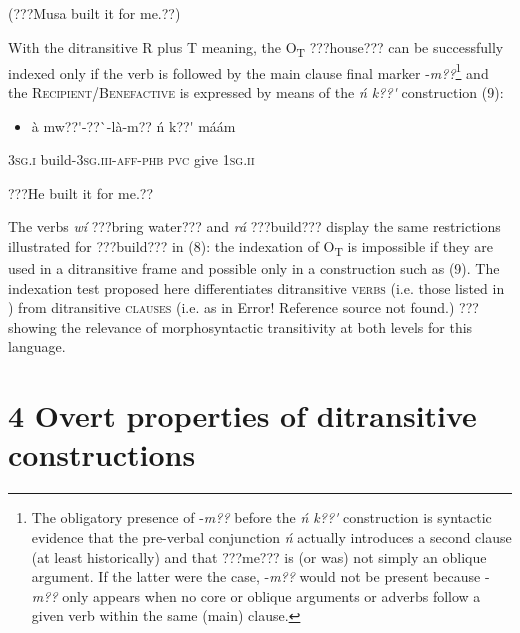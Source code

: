\documentclass[output=paper]{langsci/langscibook}
\begin{document}
\begin{styleTranslation}
(???Musa built it for me.??)
\end{styleTranslation}

With the ditransitive R plus T meaning, the O\textsubscript{T} ???house??? can be successfully indexed only if the verb is followed by the main clause final marker -\textit{m??}\footnote{ The obligatory presence of -\textit{m??} before the \textit{\'{n} k??\'{ }} construction is syntactic evidence that the pre-verbal conjunction \textit{\'{n} }actually introduces a second clause (at least historically) and that ???me??? is (or was) not simply an oblique argument. If the latter were the case, -\textit{m??} would not be present because -\textit{m??} only appears when no core or oblique arguments or adverbs follow a given verb within the same (main) clause.}{ }and the \textsc{Recipient/Benefactive} is expressed by means of the \textit{\'{n} k??\'{ }} construction (9):

\begin{itemize}
\item \begin{styleNumberedEX}
\label{bkm:Ref446636254}\`{a}    mw??\'{ }-??\`{ }-l\`{a}-m??      \'{n}  k??\'{ }  m\'{a}\'{a}m
\end{styleNumberedEX}\end{itemize}
\begin{styleGloss}
\textsc{3sg.i  }  build-\textsc{3sg.iii-aff-phb}  \textsc{pvc}  give\textsc{  1sg.ii}
\end{styleGloss}

\begin{styleTranslation}
???He built it for me.??
\end{styleTranslation}

The verbs \textit{w\'{i}} ???bring water??? and \textit{r\'{a}} ???build??? display the same restrictions illustrated for ???build??? in (8): the indexation of O\textsubscript{T} is impossible if they are used in a ditransitive frame and possible only in a construction such as (9). The indexation test proposed here differentiates ditransitive \textsc{verbs} (i.e. those listed in ) from ditransitive \textsc{clauses} (i.e. as in Error! Reference source not found.) ??? showing the relevance of morphosyntactic transitivity at both levels for this language.

\chapter{4 Overt properties of ditransitive constructions }
\end{document}
